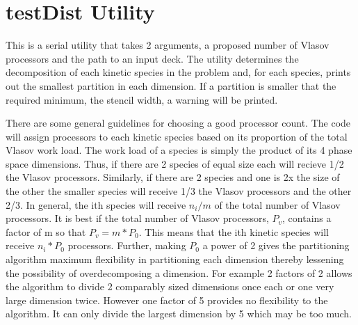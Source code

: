 \documentclass[11pt]{amsart}
\begin{document}
\section*{testDist Utility}
This is a serial utility that takes 2 arguments, a proposed number of Vlasov
processors and the path to an input deck.  The utility determines the
decomposition of each kinetic species in the problem and, for each species,
prints out the smallest partition in each dimension.  If a partition is smaller
that the required minimum, the stencil width, a warning will be printed.

There are some general guidelines for choosing a good processor count.  The code
will assign processors to each kinetic species based on its proportion of the
total Vlasov work load.  The work load of a species is simply the product of its
4 phase space dimensions.  Thus, if there are 2 species of equal size each will
recieve 1/2 the Vlasov processors.  Similarly, if there are 2 species and one
is 2x the size of the other the smaller species will receive 1/3 the Vlasov
processors and the other 2/3.  In general, the ith species will receive
\begin{math} n_{i}/m \end{math} of the total number of Vlasov processors.  It
is best if the total number of Vlasov processors,
\begin {math} P_{v} \end{math}, contains a factor of m so that
\begin {math} P_{v} = m*P_{0} \end {math}.  This means that the ith kinetic
species will receive \begin {math} n_{i}*P_{0} \end {math} processors.  Further,
making \begin {math} P_{0} \end {math} a power of 2 gives the partitioning
algorithm maximum flexibility in partitioning each dimension thereby lessening
the possibility of overdecomposing a dimension.  For example 2 factors of 2
allows the algorithm to divide 2 comparably sized dimensions once each or one
very large dimension twice.  However one factor of 5 provides no flexibility
to the algorithm.  It can only divide the largest dimension by 5 which may be
too much.
\end{document}
